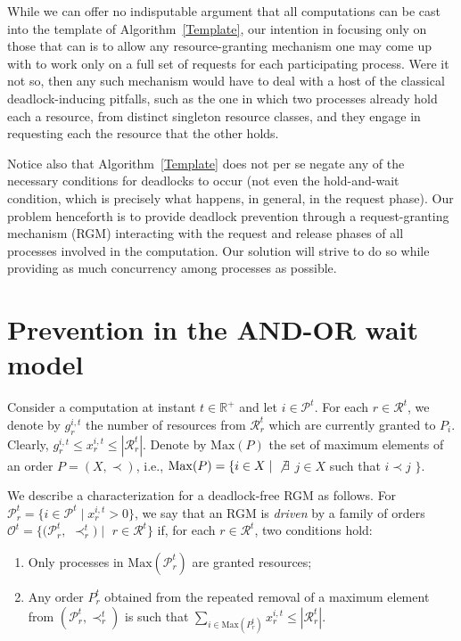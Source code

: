 \documentclass{article}
\newcommand{\Real}{{\mathbb R}}
\newcommand{\st}{\;|\;}
\newcommand{\set}[1][ ]{\{ #1 \}}
\newcommand{\R}{\mathcal{R}}
\begin{document}
While we can offer no indisputable argument that all computations can be cast
into the template of Algorithm~\ref{Template}, our intention in focusing only
on those that can is to allow any resource-granting mechanism one may come up
with to work only on a full set of requests for each participating process. Were
it not so, then any such mechanism would have to deal with a host of the
classical deadlock-inducing pitfalls, such as the one in which two processes
already hold each a resource, from distinct singleton resource classes, and they
engage in requesting each the resource that the other holds.

Notice also that Algorithm~\ref{Template} does not per se negate any of the
necessary conditions for deadlocks to occur (not even the hold-and-wait
condition, which is precisely what happens, in general, in the request phase).
Our problem henceforth is to provide deadlock prevention through a
request-granting mechanism (RGM) interacting with the request and release phases
of all processes involved in the computation. Our solution will strive to do so
while providing as much concurrency among processes as possible.

\section{Prevention in the AND-OR wait model}

Consider a computation at instant $t \in \Real^+$ and let $i \in \mathcal{P}^t$.
For each $r \in \R^t$, we denote by $g^{i,t}_r$ the number of resources from
$\R^t_r$ which are currently granted to $P_i$. Clearly,
$g^{i,t}_r \leq x^{i,t}_r \leq |\R^t_r|$. Denote by $\mathrm{Max}(P)$ the set of
maximum elements of an order $P = (X, \prec)$, i.e.,
$\mathrm{Max}(P) = \set[ i \in X \st \not \exists$ $j \in X$ such that
$i \prec j$ $]$.

We describe a characterization for a deadlock-free RGM as follows. For
$\mathcal{P}^t_r = \set [i \in \mathcal{P}^t \st x^{i,t}_r > 0]$, we say that an
RGM is \emph{driven} by a family of orders
$\mathcal{O}^t = \set [(\mathcal{P}^t_r,$ $\prec^t_r) \st$ $r \in\mathcal{R}^t]$
if, for each $r \in \mathcal{R}^t$, two conditions hold: 

\begin{enumerate}
\item Only processes in $\mathrm{Max}(\mathcal{P}^t_r)$ are granted resources; 
\item Any order $P^t_r$ obtained from the repeated removal of a maximum element
from $(\mathcal{P}^t_r, \prec^t_r)$ is such that
$\displaystyle\sum_{i \in \mathrm{Max}(P^t_r)} x^{i,t}_r\leq |\mathcal{R}^t_r|$.
\end{enumerate}
\end{document}
